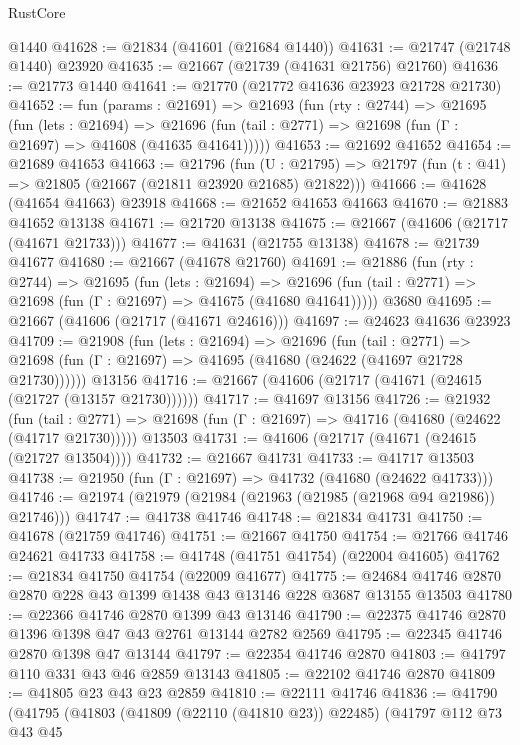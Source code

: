 \begin{lexlean}{RustCore}
\begin{coremodule}
    @1440
@41628 := @21834 (@41601 (@21684 @1440))
@41631 := @21747 (@21748 @1440) @23920
@41635 := @21667 (@21739 (@41631 @21756) @21760)
@41636 := @21773 @1440
@41641 := @21770 (@21772 @41636 @23923 @21728 @21730)
@41652 := fun (params : @21691) =>
  @21693
    (fun (rty : @2744) =>
    @21695
      (fun (lets : @21694) =>
      @21696 (fun (tail : @2771) => @21698 (fun (Γ : @21697) => @41608 (@41635 @41641)))))
@41653 := @21692 @41652
@41654 := @21689 @41653
@41663 := @21796
    (fun (U : @21795) => @21797 (fun (t : @41) => @21805 (@21667 (@21811 @23920 @21685) @21822)))
@41666 := @41628 (@41654 @41663) @23918
@41668 := @21652 @41653 @41663
@41670 := @21883 @41652 @13138
@41671 := @21720 @13138
@41675 := @21667 (@41606 (@21717 (@41671 @21733)))
@41677 := @41631 (@21755 @13138)
@41678 := @21739 @41677
@41680 := @21667 (@41678 @21760)
@41691 := @21886
    (fun (rty : @2744) =>
    @21695
      (fun (lets : @21694) =>
      @21696 (fun (tail : @2771) => @21698 (fun (Γ : @21697) => @41675 (@41680 @41641)))))
    @3680
@41695 := @21667 (@41606 (@21717 (@41671 @24616)))
@41697 := @24623 @41636 @23923
@41709 := @21908
    (fun (lets : @21694) =>
    @21696
      (fun (tail : @2771) =>
      @21698 (fun (Γ : @21697) => @41695 (@41680 (@24622 (@41697 @21728 @21730))))))
    @13156
@41716 := @21667 (@41606 (@21717 (@41671 (@24615 (@21727 (@13157 @21730))))))
@41717 := @41697 @13156
@41726 := @21932
    (fun (tail : @2771) => @21698 (fun (Γ : @21697) => @41716 (@41680 (@24622 (@41717 @21730)))))
    @13503
@41731 := @41606 (@21717 (@41671 (@24615 (@21727 @13504))))
@41732 := @21667 @41731
@41733 := @41717 @13503
@41738 := @21950 (fun (Γ : @21697) => @41732 (@41680 (@24622 @41733)))
@41746 := @21974 (@21979 (@21984 (@21963 (@21985 (@21968 @94 @21986)) @21746)))
@41747 := @41738 @41746
@41748 := @21834 @41731
@41750 := @41678 (@21759 @41746)
@41751 := @21667 @41750
@41754 := @21766 @41746 @24621 @41733
@41758 := @41748 (@41751 @41754) (@22004 @41605)
@41762 := @21834 @41750 @41754 (@22009 @41677)
@41775 := @24684 @41746 @2870 @2870 @228 @43 @1399 @1438 @43 @13146 @228 @3687 @13155 @13503
@41780 := @22366 @41746 @2870 @1399 @43 @13146
@41790 := @22375 @41746 @2870 @1396 @1398 @47 @43 @2761 @13144 @2782 @2569
@41795 := @22345 @41746 @2870 @1398 @47 @13144
@41797 := @22354 @41746 @2870
@41803 := @41797 @110 @331 @43 @46 @2859 @13143
@41805 := @22102 @41746 @2870
@41809 := @41805 @23 @43 @23 @2859
@41810 := @22111 @41746
@41836 := @41790
    (@41795
      (@41803
        (@41809 (@22110 (@41810 @23)) @22485)
        (@41797
          @112
          @73
          @43
          @45

\end{coremodule}
\end{lexlean}
